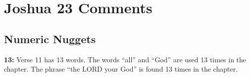 \section{Joshua 23 Comments}

\subsection{Numeric Nuggets}
\textbf{13: } Verse 11 has 13 words. The words ``all'' and ``God'' are used 13 times in the chapter. The phrase ``the LORD your God'' is found 13 times in the chapter.

